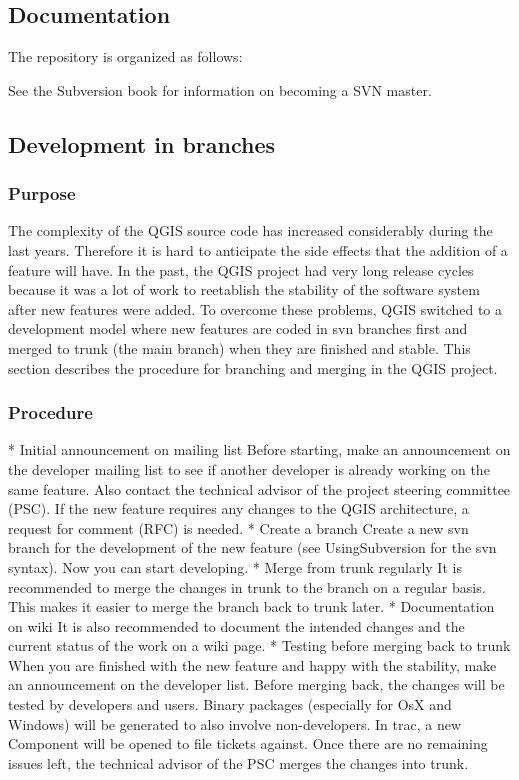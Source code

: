 \subsection{Documentation}
The repository is organized as follows:


See the Subversion book  for information on becoming a SVN master.

\subsection{Development in branches}
\subsubsection{Purpose}
The complexity of the QGIS source code has increased considerably during the last years. Therefore it is hard 
to anticipate the side effects that the addition of a feature will have. In the past, the QGIS project had very 
long release cycles because it was a lot of work to reetablish the stability of the software system after new 
features were added. To overcome these problems, QGIS switched to a development model where new features are 
coded in svn branches first and merged to trunk (the main branch) when they are finished and stable. This section 
describes the procedure for branching and merging in the QGIS project.

\subsubsection{Procedure}
 * Initial announcement on mailing list
Before starting, make an announcement on the developer mailing list to see if another developer is 
already working on the same feature. Also contact the technical advisor of the project steering committee 
(PSC). If the new feature requires any changes to the QGIS architecture, a request for comment (RFC) is needed. 
 * Create a branch
Create a new svn branch for the development of the new feature (see UsingSubversion for the svn syntax). Now 
you can start developing.
 * Merge from trunk regularly
It is recommended to merge the changes in trunk to the branch on a regular basis. This makes it easier to merge 
the branch back to trunk later.
 * Documentation on wiki
It is also recommended to document the intended changes and the current status of the work on a wiki page.
 * Testing before merging back to trunk
When you are finished with the new feature and happy with the stability, make an announcement on the developer list. 
Before merging back, the changes will be tested by developers and users. Binary packages (especially for OsX and Windows) 
will be generated to also involve non-developers. In trac, a new Component will be opened to file tickets against. 
Once there are no remaining issues left, the technical advisor of the PSC merges the changes into trunk.

